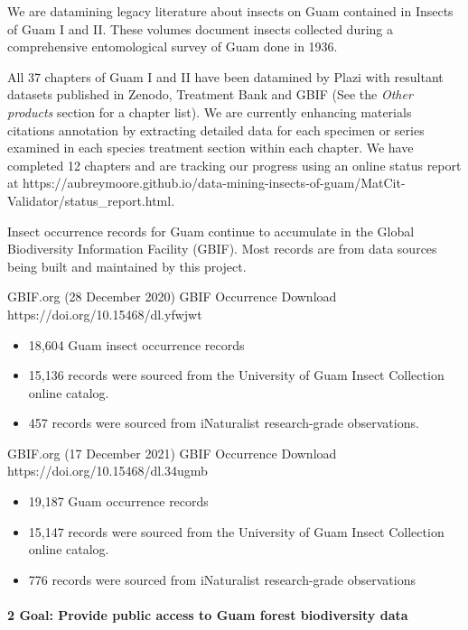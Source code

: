 \documentclass[
]{article}
\providecommand{\tightlist}{%
  \setlength{\itemsep}{0pt}\setlength{\parskip}{0pt}}
\begin{document}
We are datamining legacy literature about insects on Guam contained in
Insects of Guam I and II. These volumes document insects collected
during a comprehensive entomological survey of Guam done in 1936.

All 37 chapters of Guam I and II have been datamined by Plazi with
resultant datasets published in Zenodo, Treatment Bank and GBIF (See the
\emph{Other products} section for a chapter list). We are currently
enhancing materials citations annotation by extracting detailed data for
each specimen or series examined in each species treatment section
within each chapter. We have completed 12 chapters and are tracking our
progress using an online status report at
https://aubreymoore.github.io/data-mining-insects-of-guam/MatCit-Validator/status\_report.html.

Insect occurrence records for Guam continue to accumulate in the Global
Biodiversity Information Facility (GBIF). Most records are from data
sources being built and maintained by this project.

GBIF.org (28 December 2020) GBIF Occurrence Download
https://doi.org/10.15468/dl.yfwjwt

\begin{itemize}
\tightlist
\item
  18,604 Guam insect occurrence records
\item
  15,136 records were sourced from the University of Guam Insect
  Collection online catalog.
\item
  457 records were sourced from iNaturalist research-grade observations.
\end{itemize}

GBIF.org (17 December 2021) GBIF Occurrence Download
https://doi.org/10.15468/dl.34ugmb

\begin{itemize}
\tightlist
\item
  19,187 Guam occurrence records
\item
  15,147 records were sourced from the University of Guam Insect
  Collection online catalog.
\item
  776 records were sourced from iNaturalist research-grade observations
\end{itemize}

\hypertarget{goal-provide-public-access-to-guam-forest-biodiversity-data-1}{%
\paragraph{2 Goal: Provide public access to Guam forest biodiversity
data}\label{goal-provide-public-access-to-guam-forest-biodiversity-data-1}}
\end{document}
